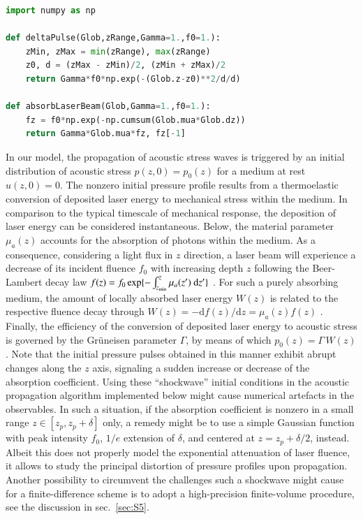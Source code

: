 \documentclass[5p,times,twocolumn]{elsarticle}
\begin{document}
\begin{lstlisting}[float,captionpos=b,keywordstyle=\bf, frame=lines, language=Python,basicstyle=\ttfamily\scriptsize, 
caption={Implementation of 
a function that yields an initial acoustic stress profile based on the optical
absorption of laser light by an attenuating medium, contained in {\tt{python}}
module file {\tt{opticalAbsorption.py}}.}, label=code:laserBeam]
import numpy as np

def deltaPulse(Glob,zRange,Gamma=1.,f0=1.):
    zMin, zMax = min(zRange), max(zRange) 
    z0, d = (zMax - zMin)/2, (zMin + zMax)/2
    return Gamma*f0*np.exp(-(Glob.z-z0)**2/d/d)

def absorbLaserBeam(Glob,Gamma=1.,f0=1.):
    fz = f0*np.exp(-np.cumsum(Glob.mua*Glob.dz))
    return Gamma*Glob.mua*fz, fz[-1] 
\end{lstlisting}

In our model, the propagation of acoustic stress waves is triggered by an
initial distribution of acoustic stress $p(z,0)=p_0(z)$ for a medium at rest
$u(z,0)=0$. The nonzero initial pressure profile results from a thermoelastic
conversion of deposited laser energy to mechanical stress within the medium. 
In comparison to the typical timescale of mechanical response, the deposition
of laser energy can be considered instantaneous.
Below, the material parameter $\mu_a(z)$ accounts for the absorption of photons
within the medium. As a consequence, considering a light flux in $z$ direction,
a laser beam will experience a decrease of its incident fluence $f_0$ with
increasing depth $z$ following the Beer-Lambert decay law $f(z) = f_0
\exp\{-\int_{z_{\rm{min}}}^z \mu_a(z^\prime)~\mathrm{d}z^\prime\}$
\cite{Paltauf:2000}.  For such a purely absorbing medium, the amount of locally
absorbed laser energy $W(z)$ is related to the respective fluence decay through
$W(z) = - \mathrm{d}f(z)/\mathrm{d}z = \mu_a(z) f(z)$ \cite{Welch:1984}.
Finally, the efficiency of the conversion of deposited laser energy to acoustic
stress is governed by the Gr\"uneisen parameter $\Gamma$, by means of which
$p_0(z)=\Gamma\,W(z)$.  Note that the initial pressure pulses obtained in this
manner exhibit abrupt changes along the $z$ axis, signaling a sudden increase
or decrease of the absorption coefficient. Using these ``shockwave'' initial
conditions in the acoustic propagation algorithm implemented below might cause
numerical artefacts in the observables. In such a situation, if the absorption
coefficient is nonzero in a small range $z \in [z_p, z_p+\delta]$ only, a
remedy might be to use a simple Gaussian function with peak intensity $f_0$,
$1/e$ extension of $\delta$, and centered at $z=z_p + \delta/2$, instead.
Albeit this does not properly model the exponential attenuation of laser
fluence, it allows to study the principal distortion of pressure profiles upon
propagation.
Another possibility to circumvent the challenges such a shockwave might cause
for a finite-difference scheme is to adopt a high-precision finite-volume
procedure, see the discussion in sec.\ \ref{sec:S5}.
\end{document}
